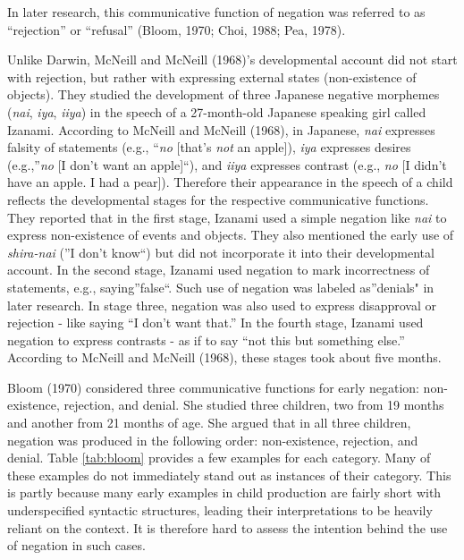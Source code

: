 \documentclass[
  english,
  man,floatsintext]{apa6}
\begin{document}
In later research, this communicative function of negation was referred to as ``rejection'' or ``refusal'' (Bloom, 1970; Choi, 1988; Pea, 1978).

Unlike Darwin, McNeill and McNeill (1968)'s developmental account did not start with rejection, but rather with expressing external states (non-existence of objects). They studied the development of three Japanese negative morphemes (\emph{nai}, \emph{iya}, \emph{iiya}) in the speech of a 27-month-old Japanese speaking girl called Izanami. According to McNeill and McNeill (1968), in Japanese, \emph{nai} expresses falsity of statements (e.g., ``\emph{no} {[}that's \emph{not} an apple{]}), \emph{iya} expresses desires (e.g.,''\emph{no} {[}I don't want an apple{]}``), and \emph{iiya} expresses contrast (e.g., \emph{no} {[}I didn't have an apple. I had a pear{]}). Therefore their appearance in the speech of a child reflects the developmental stages for the respective communicative functions. They reported that in the first stage, Izanami used a simple negation like \emph{nai} to express non-existence of events and objects. They also mentioned the early use of \emph{shira-nai} (''I don't know``) but did not incorporate it into their developmental account. In the second stage, Izanami used negation to mark incorrectness of statements, e.g., saying''false``. Such use of negation was labeled as''denials" in later research. In stage three, negation was also used to express disapproval or rejection - like saying ``I don't want that.'' In the fourth stage, Izanami used negation to express contrasts - as if to say ``not this but something else.'' According to McNeill and McNeill (1968), these stages took about five months.

Bloom (1970) considered three communicative functions for early negation: non-existence, rejection, and denial. She studied three children, two from 19 months and another from 21 months of age. She argued that in all three children, negation was produced in the following order: non-existence, rejection, and denial. Table \ref{tab:bloom} provides a few examples for each category. Many of these examples do not immediately stand out as instances of their category. This is partly because many early examples in child production are fairly short with underspecified syntactic structures, leading their interpretations to be heavily reliant on the context. It is therefore hard to assess the intention behind the use of negation in such cases.
\end{document}
